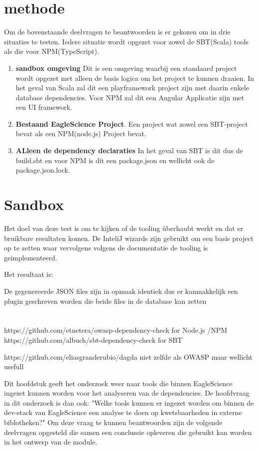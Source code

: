 \section{methode}
Om de bovenstaande deelvragen te beantwoorden is er gekozen om in drie situaties te testen. Iedere situatie wordt opgezet voor zowel de SBT(Scala) tools als die voor NPM(TypeScript).
\begin{enumerate}
    \item \textbf{sandbox omgeving} Dit is een omgeving waarbij een standaard project wordt opgezet met alleen de basis logica om het project te kunnen draaien. In het geval van Scala zal dit een playframework project zijn met daarin enkele database dependencies. Voor NPM zal dit een Angular Applicatie zijn met een UI framework.
    \item \textbf{Bestaand EagleScience Project}. Een project wat zowel een SBT-project bevat als een NPM(node.js) Project bevat.
    \item \textbf{ALleen de dependency declaraties} In het geval van SBT is dit dus de build.sbt en voor NPM is dit  een package.json en wellicht ook de package.json.lock.
\end{enumerate}

\section{Sandbox}
Het doel van deze test is om te kijken of de tooling überhaubt werkt en dat er bruikbare resultaten komen. De InteliJ wizards zijn gebruikt om een basis project op te zetten waar vervolgens volgens de documentatie de tooling is geimplementeerd.

Het resultaat is:

De gegenereerde JSON files zijn in opmaak identiek dus er kanmakkelijk een plugin geschreven worden die beide files in de database kan zetten
\section{}

https://github.com/etnetera/owasp-dependency-check for Node.js /NPM
https://github.com/albuch/sbt-dependency-check for SBT

https://github.com/eliasgranderubio/dagda niet zelfde als OWASP maar wellicht usefull


Dit hoofdstuk geeft het onderzoek weer naar tools die binnen EagleScience ingezet kunnen worden voor het analyseren van de dependencies. De hoofdvraag in dit onderzoek is dan ook: "Welke tools kunnen er ingezet worden om binnen de dev-stack van EagleScience een analyse te doen op kwetsbaarheden in externe biblotheken?" Om deze vraag te kunnen beantwoorden zijn de volgende deelvragen opgesteld die samen een conclussie opleveren die gebruikt kan worden in het ontwerp van de module.




